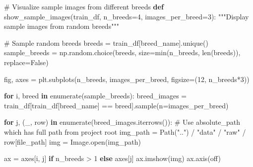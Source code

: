 \documentclass[
  letterpaper,
  DIV=11,
  numbers=noendperiod]{scrartcl}
\newenvironment{Shaded}{\begin{snugshade}}{\end{snugshade}}
\newcommand{\BuiltInTok}[1]{\textcolor[rgb]{0.00,0.23,0.31}{#1}}
\newcommand{\CommentTok}[1]{\textcolor[rgb]{0.37,0.37,0.37}{#1}}
\newcommand{\ControlFlowTok}[1]{\textcolor[rgb]{0.00,0.23,0.31}{\textbf{#1}}}
\newcommand{\DecValTok}[1]{\textcolor[rgb]{0.68,0.00,0.00}{#1}}
\newcommand{\KeywordTok}[1]{\textcolor[rgb]{0.00,0.23,0.31}{\textbf{#1}}}
\newcommand{\NormalTok}[1]{\textcolor[rgb]{0.00,0.23,0.31}{#1}}
\newcommand{\OperatorTok}[1]{\textcolor[rgb]{0.37,0.37,0.37}{#1}}
\newcommand{\StringTok}[1]{\textcolor[rgb]{0.13,0.47,0.30}{#1}}
\newcommand{\VariableTok}[1]{\textcolor[rgb]{0.07,0.07,0.07}{#1}}
\renewenvironment{Shaded}{%
  \begin{tcolorbox}[%
    enhanced,%
    colback=codebg,%
    colframe=codebg,%
    borderline west={3pt}{0pt}{sectionblue},%
    boxrule=0pt,%
    arc=0pt,%
    boxsep=5pt,%
    left=2mm,%
    right=2mm,%
    top=2mm,%
    bottom=2mm%
  ]%
}{%
  \end{tcolorbox}%
}
\begin{document}
\begin{Shaded}
\begin{Highlighting}[]
\CommentTok{\# Visualize sample images from different breeds}
\KeywordTok{def}\NormalTok{ show\_sample\_images(train\_df, n\_breeds}\OperatorTok{=}\DecValTok{4}\NormalTok{, images\_per\_breed}\OperatorTok{=}\DecValTok{3}\NormalTok{):}
    \CommentTok{"""Display sample images from random breeds"""}
    
    \CommentTok{\# Sample random breeds}
\NormalTok{    breeds }\OperatorTok{=}\NormalTok{ train\_df[}\StringTok{\textquotesingle{}breed\_name\textquotesingle{}}\NormalTok{].unique()}
\NormalTok{    sample\_breeds }\OperatorTok{=}\NormalTok{ np.random.choice(breeds, size}\OperatorTok{=}\BuiltInTok{min}\NormalTok{(n\_breeds, }\BuiltInTok{len}\NormalTok{(breeds)), replace}\OperatorTok{=}\VariableTok{False}\NormalTok{)}
    
\NormalTok{    fig, axes }\OperatorTok{=}\NormalTok{ plt.subplots(n\_breeds, images\_per\_breed, figsize}\OperatorTok{=}\NormalTok{(}\DecValTok{12}\NormalTok{, n\_breeds}\OperatorTok{*}\DecValTok{3}\NormalTok{))}
    
    \ControlFlowTok{for}\NormalTok{ i, breed }\KeywordTok{in} \BuiltInTok{enumerate}\NormalTok{(sample\_breeds):}
\NormalTok{        breed\_images }\OperatorTok{=}\NormalTok{ train\_df[train\_df[}\StringTok{\textquotesingle{}breed\_name\textquotesingle{}}\NormalTok{] }\OperatorTok{==}\NormalTok{ breed].sample(n}\OperatorTok{=}\NormalTok{images\_per\_breed)}
        
        \ControlFlowTok{for}\NormalTok{ j, (\_, row) }\KeywordTok{in} \BuiltInTok{enumerate}\NormalTok{(breed\_images.iterrows()):}
            \CommentTok{\# Use absolute\_path which has full path from project root}
\NormalTok{            img\_path }\OperatorTok{=}\NormalTok{ Path(}\StringTok{".."}\NormalTok{) }\OperatorTok{/} \StringTok{"data"} \OperatorTok{/} \StringTok{"raw"} \OperatorTok{/}\NormalTok{ row[}\StringTok{\textquotesingle{}file\_path\textquotesingle{}}\NormalTok{]}
\NormalTok{            img }\OperatorTok{=}\NormalTok{ Image.}\BuiltInTok{open}\NormalTok{(img\_path)}
            
\NormalTok{            ax }\OperatorTok{=}\NormalTok{ axes[i, j] }\ControlFlowTok{if}\NormalTok{ n\_breeds }\OperatorTok{\textgreater{}} \DecValTok{1} \ControlFlowTok{else}\NormalTok{ axes[j]}
\NormalTok{            ax.imshow(img)}
\NormalTok{            ax.axis(}\StringTok{\textquotesingle{}off\textquotesingle{}}\NormalTok{)}
            

\end{Highlighting}
\end{Shaded}
\end{document}
